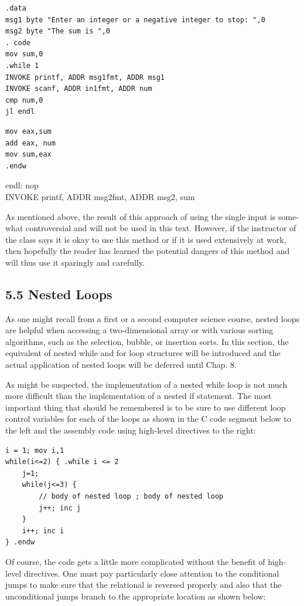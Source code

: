 \documentclass[10pt]{article}
\begin{document}
\begin{verbatim}
.data
msg1 byte "Enter an integer or a negative integer to stop: ",0
msg2 byte "The sum is ",0
. code
mov sum,0
.while 1
INVOKE printf, ADDR msg1fmt, ADDR msg1
INVOKE scanf, ADDR in1fmt, ADDR num
cmp num,0
jl endl
\end{verbatim}

\begin{verbatim}
mov eax,sum
add eax, num
mov sum,eax
.endw
\end{verbatim}

endl: nop\\
INVOKE printf, ADDR msg2fmt, ADDR msg2, sum

As mentioned above, the result of this approach of using the single input is some-what controversial and will not be used in this text. However, if the instructor of the class says it is okay to use this method or if it is used extensively at work, then hopefully the reader has learned the potential dangers of this method and will thus use it sparingly and carefully.

\subsection*{5.5 Nested Loops}
As one might recall from a first or a second computer science course, nested loops are helpful when accessing a two-dimensional array or with various sorting algorithms, such as the selection, bubble, or insertion sorts. In this section, the equivalent of nested while and for loop structures will be introduced and the actual application of nested loops will be deferred until Chap. 8.

As might be suspected, the implementation of a nested while loop is not much more difficult than the implementation of a nested if statement. The most important thing that should be remembered is to be sure to use different loop control variables for each of the loops as shown in the C code segment below to the left and the assembly code using high-level directives to the right:

\begin{verbatim}
i = 1; mov i,1
while(i<=2) { .while i <= 2
    j=1;
    while(j<=3) {
        // body of nested loop ; body of nested loop
        j++; inc j
    }
    i++; inc i
} .endw
\end{verbatim}

Of course, the code gets a little more complicated without the benefit of high-level directives. One must pay particularly close attention to the conditional jumps to make sure that the relational is reversed properly and also that the unconditional jumps branch to the appropriate location as shown below:
\end{document}
